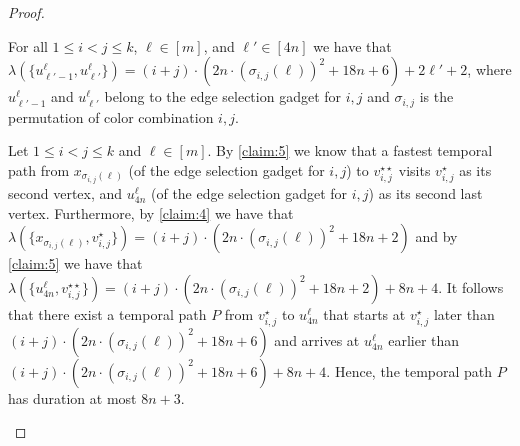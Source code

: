\documentclass[a4paper,UKenglish,cleveref, autoref, thm-restate, anonymous]{lipics-v2021}
\begin{document}
\begin{proof}
\begin{claim}\label{claim:6}
    For all $1\le i<j\le k$,  $\ell\in[m]$, and $\ell'\in[4n]$ we have that $\lambda(\{u^\ell_{\ell'-1},u^\ell_{\ell'}\})=(i+j)\cdot (2n\cdot (\sigma_{i,j}(\ell))^2 +18n+6)+2\ell'+2$, where $u^\ell_{\ell'-1}$ and $u^\ell_{\ell'}$ belong to the edge selection gadget for $i,j$ and $\sigma_{i,j}$ is the permutation of color combination $i,j$.
\end{claim}
\begin{claimproof}
    Let $1\le i<j\le k$ and $\ell\in[m]$.
    By \cref{claim:5} we know that a fastest temporal path from $x_{\sigma_{i,j}(\ell)}$ (of the edge selection gadget for $i,j$) to $v_{i,j}^{\star\star}$ visits $v_{i,j}^\star$ as its second vertex, and $u^{\ell}_{4n}$ (of the edge selection gadget for $i,j$) as its second last vertex. 
    Furthermore, by \cref{claim:4} we have that $\lambda(\{x_{\sigma_{i,j}(\ell)},v_{i,j}^{\star}\})=(i+j)\cdot (2n\cdot {(\sigma_{i,j}(\ell))^2}+18n +2)$ and by \cref{claim:5} we have that $\lambda(\{u^\ell_{4n},v_{i,j}^{\star\star}\})=(i+j)\cdot (2n\cdot (\sigma_{i,j}(\ell))^2+18n +2)+8n+4$. It follows that there exist a temporal path $P$ from $v_{i,j}^\star$ to $u^\ell_{4n}$ that starts at $v_{i,j}^\star$ later than $(i+j)\cdot (2n\cdot {(\sigma_{i,j}(\ell))^2} +18n+6)$ and arrives at $u^\ell_{4n}$ earlier than $(i+j)\cdot (2n\cdot (\sigma_{i,j}(\ell))^2 +18n+6)+8n+4$. Hence, the temporal path $P$ has duration at most $8n+3$.


\end{claimproof}
\end{proof}
\end{document}
